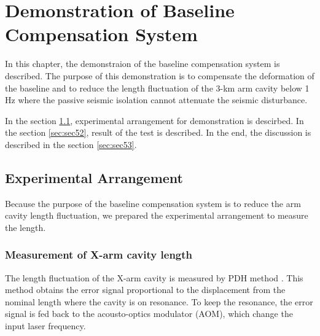 \chapter{Demonstration of Baseline Compensation System}
In this chapter, the demonstraion of the baseline compensation system is described. The purpose of this demonstration is to compensate the deformation of the baseline and to reduce the length fluctuation of the 3-km arm cavity below 1 Hz where the passive seismic isolation cannot attenuate the seismic disturbance. 

In the section \cref{sec:sec51}, experimental arrangement for demonstration is descirbed. In the section \cref{sec:sec52}, result of the test is described. In the end, the discussion is described in the section \cref{sec:sec53}.

\section{Experimental Arrangement} \label{sec:sec51}
Because the purpose of the baseline compensation system is to reduce the arm cavity length fluctuation, we prepared the experimental arrangement to measure the length.

\subsection{Measurement of X-arm cavity length}
The length fluctuation of the X-arm cavity is measured by PDH method \cite{drever1983laser}. This method obtains the error signal proportional to the displacement from the nominal length where the cavity is on resonance. To keep the resonance, the error signal is fed back to the acousto-optics modulator (AOM), which change the input laser frequency.

